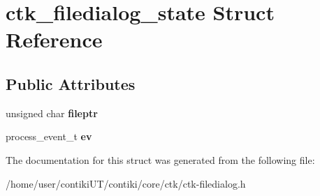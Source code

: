\hypertarget{structctk__filedialog__state}{}\section{ctk\+\_\+filedialog\+\_\+state Struct Reference}
\label{structctk__filedialog__state}
\subsection*{Public Attributes}
\begin{DoxyCompactItemize}
\item 
\hypertarget{structctk__filedialog__state_a2d9b1156daa4b50cd76ba74fb1a1e95c}{}unsigned char {\bfseries fileptr}\label{structctk__filedialog__state_a2d9b1156daa4b50cd76ba74fb1a1e95c}

\item 
\hypertarget{structctk__filedialog__state_a2b807f418bd4fe68c58a225736dfbb6d}{}process\+\_\+event\+\_\+t {\bfseries ev}\label{structctk__filedialog__state_a2b807f418bd4fe68c58a225736dfbb6d}

\end{DoxyCompactItemize}


The documentation for this struct was generated from the following file\+:\begin{DoxyCompactItemize}
\item 
/home/user/contiki\+U\+T/contiki/core/ctk/ctk-\/filedialog.\+h\end{DoxyCompactItemize}
